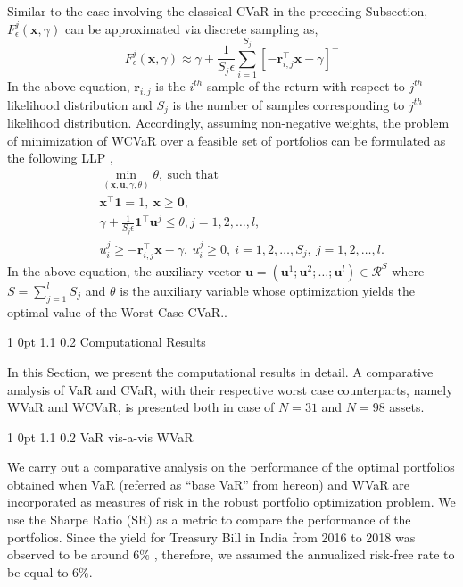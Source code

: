 \documentclass[12pt]{article}
\makeatletter
\numberwithin{equation}{section}
\renewcommand{\section}{
  \@startsection
  {section}%
  {1}%
  {0pt}%
  {1.1\baselineskip}%
  {0.2\baselineskip}%
  {\sc \centering}%
}
\renewcommand{\subsection}{
  \@startsection
  {subsection}%
  {1}%
  {0pt}%
  {1.1\baselineskip}%
  {0.2\baselineskip}%
  {\sc \centering}%
}
\makeatother
\begin{document}
Similar to the case involving the classical CVaR in the preceding Subsection, $\displaystyle{F_{\epsilon}^{j}(\mathbf{x},\gamma)}$
can be approximated via discrete sampling as,
\begin{equation}
F_{\epsilon}^{j}(\mathbf{x},\gamma) \approx \gamma+\frac{1}{S_{j}\epsilon}\sum\limits_{i=1}^{S_{j}}
\left[-\mathbf{r}_{i,j}^{\top}\mathbf{x}-\gamma\right]^{+}
\label{eq:6.10}
\end{equation}
In the above equation, $\mathbf{r}_{i,j}$ is the $i^{th}$ sample of the return with respect to $j^{th}$ likelihood distribution and $S_{j}$ is the
number of samples corresponding to $j^{th}$ likelihood distribution. Accordingly, assuming non-negative weights, the problem of minimization of WCVaR over a feasible set of portfolios can be formulated as the following LLP \cite{zhu},
\begin{eqnarray}
&& \min_{(\mathbf{x},\mathbf{u},\gamma,\theta)} \theta,~\text{such that}\\ \nonumber
&& \mathbf{x}^{\top}\mathbf{1}=1,~\mathbf{x} \geq \mathbf{0},\\ \nonumber
&& \gamma + \frac{1}{S_{j} \epsilon} \mathbf{1}^{\top}\mathbf{u}^{j} \leq \theta, j=1,2,\dots,l,\\
&& u_{i}^{j} \geq-\mathbf{r}_{i,j}^{\top}\mathbf{x}-\gamma,~u_{i}^{j} \geq 0,~i=1,2,\dots,S_{j},~j=1,2,\dots,l. \nonumber
\label{eq:6.11}
\end{eqnarray}
In the above equation, the auxiliary vector $\mathbf{u}=(\mathbf{u}^{1};\mathbf{u}^{2};\dots; \mathbf{u}^{l}) \in \mathcal{R}^{S}$ where $\displaystyle{S=\sum\limits_{j=1}^{l}S_{j}}$ and $\theta$ is the auxiliary variable whose optimization yields the optimal value of the Worst-Case CVaR..

\section{Computational Results}
\label{Computational_Results}

In this Section, we present the computational results in detail. A comparative analysis of VaR and CVaR, with their respective worst case counterparts,
namely WVaR and WCVaR, is presented both in case of $N=31$ and $N=98$ assets.

\subsection{VaR vis-a-vis WVaR}

We carry out a comparative analysis on the performance of the optimal portfolios obtained when VaR (referred as ``base VaR'' from hereon) and WVaR are incorporated as measures of risk in the robust portfolio optimization problem. We use the Sharpe Ratio (SR) as a metric to compare the performance of the portfolios. Since the yield for Treasury Bill in India from 2016 to 2018 was observed to be around $6\%$ \cite{rbi},
therefore, we assumed the annualized risk-free rate to be equal to $6\%$.
\end{document}
